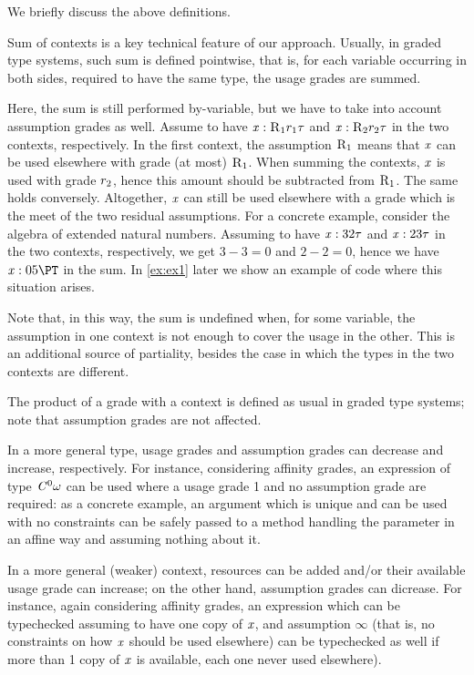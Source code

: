 We briefly discuss the above definitions. 

Sum of contexts is a key technical feature of our approach. 
 Usually, in graded type systems, such sum is defined pointwise, that is, for each variable occurring in both sides, required to have the same type, the usage grades are summed. 

Here, the sum is still performed by-variable, but we have to take into account assumption grades as well. Assume to have $\mathit{x} :\textsc{R}_1{r_1}{\tau}$ and $\mathit{x} :\textsc{R}_2{r_2}{\tau}$ in the two contexts, respectively. In the first context, the assumption $\textsc{R}_1$ means that $\mathit{x}$ can be used elsewhere with grade (at most) $\textsc{R}_1$.  When summing the contexts, $\mathit{x}$ is used with grade $r_2$, hence this amount should be subtracted from $\textsc{R}_1$. The same holds conversely. Altogether, $\mathit{x}$ can still be used elsewhere with a grade which is the meet of the two residual assumptions. 
For a concrete example, consider the algebra of extended natural numbers. Assuming to have $\mathit{x} :3{2}{\tau}$ and $\mathit{x} :2{3}{\tau}$ in the two contexts, respectively, we get $3-3=0$ and $2-2=0$, hence we have $\CtxElem{\x}{0}{5}{\PT}$ in the sum.  In \cref{ex:ex1} later we show an example of code where this situation arises. 

Note that, in this way, the sum is undefined when, for some variable, the assumption in one context is not enough to cover the usage in the other. This is an additional source of partiality, besides the case in which the types in the two contexts are different. 

The product of a grade with a context is defined as usual in graded type systems; note that assumption grades are not affected.

In a more general type, usage grades and assumption grades can decrease and increase, respectively. For instance, considering affinity grades,
an expression of type $\mathit{C}^{0}{\omega}$ can be used where a usage grade 1 and no assumption grade are required: as a concrete example, an argument which is unique and can be used with no constraints can be safely passed to a method handling the parameter in an affine way and assuming nothing about it. 

 In a more general (weaker) context, resources can be added and/or their available usage grade can increase; on the other hand, assumption grades can dicrease. For instance, again considering affinity grades, an expression which can be typechecked assuming to have one copy of $\mathit{x}$, and assumption $\infty$ (that is, no constraints on how $\mathit{x}$ should be used elsewhere) can be typechecked as well if more than 1 copy of $\mathit{x}$ is available, each one never used elsewhere). 
 

